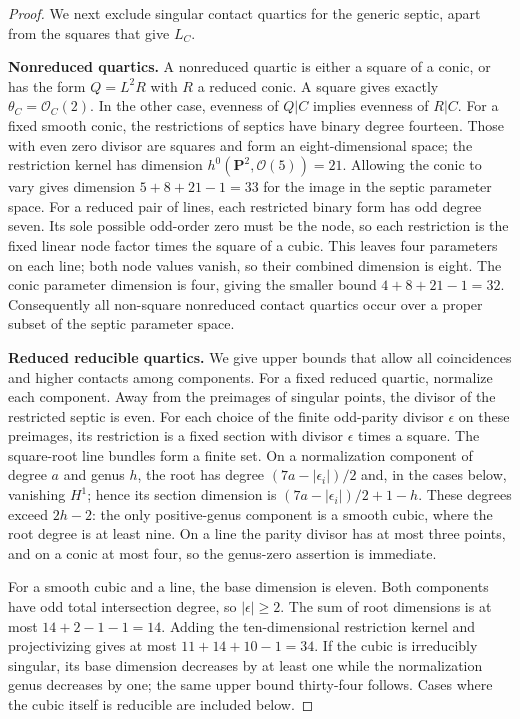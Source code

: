 \begin{proof}
We next exclude singular contact quartics for the generic septic,
apart from the squares that give $L_C$.

\par\smallskip\noindent\textbf{Nonreduced quartics.}
A nonreduced quartic is either a square of a conic, or has the form
$Q=L^2R$ with $R$ a reduced conic.  A square gives exactly
$\theta_C=\mathcal O_C(2)$.  In the other case, evenness of $Q|C$
implies evenness of $R|C$.
For a fixed smooth conic, the restrictions of septics have binary
degree fourteen.  Those with even zero divisor are squares and form
an eight-dimensional space; the restriction kernel has dimension
$h^0(\mathbf P^2,\mathcal O(5))=21$.
Allowing the conic to vary gives dimension
$5+8+21-1=33$ for the image in the septic parameter space.
For a reduced pair of lines, each restricted binary form has odd
degree seven.  Its sole possible odd-order zero must be the node,
so each restriction is the fixed linear node factor times the
square of a cubic.  This leaves four parameters on each line;
both node values vanish, so their combined dimension is eight.
The conic parameter dimension is four, giving the smaller bound
$4+8+21-1=32$.  Consequently all non-square nonreduced contact
quartics occur over a proper subset of the septic parameter space.

\par\smallskip\noindent\textbf{Reduced reducible quartics.}
We give upper bounds that allow all coincidences and higher contacts
among components.  For a fixed reduced quartic, normalize each
component.  Away from the preimages of singular points, the divisor
of the restricted septic is even.  For each choice of the finite
odd-parity divisor $\epsilon$ on these preimages, its restriction
is a fixed section with divisor $\epsilon$ times a square.
The square-root line bundles form a finite set.  On a normalization
component of degree $a$ and genus $h$, the root has degree
$(7a-|\epsilon_i|)/2$ and, in the cases below, vanishing $H^1$;
hence its section dimension is
$(7a-|\epsilon_i|)/2+1-h$.
These degrees exceed $2h-2$: the only positive-genus component is
a smooth cubic, where the root degree is at least nine.
On a line the parity divisor has at most three points, and on a
conic at most four, so the genus-zero assertion is immediate.

For a smooth cubic and a line, the base dimension is eleven.
Both components have odd total intersection degree, so
$|\epsilon|\ge2$.  The sum of root dimensions is at most
$14+2-1-1=14$.  Adding the ten-dimensional restriction kernel and
projectivizing gives at most $11+14+10-1=34$.
If the cubic is irreducibly singular, its base dimension decreases
by at least one while the normalization genus decreases by one;
the same upper bound thirty-four follows.  Cases where the cubic
itself is reducible are included below.


\end{proof}
